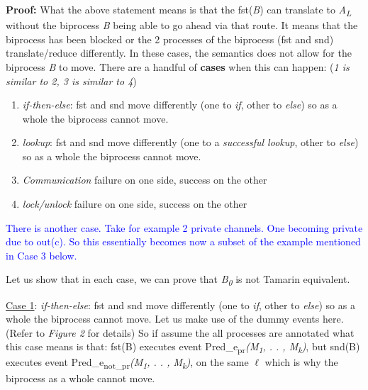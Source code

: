 \documentclass[11pt]{article}
\begin{document}
{\bf Proof: }What the above statement means is that the fst({\it B}) can translate to {\it A\textsubscript{L}} without the biprocess {\it B} being able to go ahead via that route. It means that the biprocess has been blocked or the 2 processes of the biprocess (fst and snd) translate/reduce differently. In these cases, the semantics does not allow for the biprocess {\it B} to move. There are a handful of {\bf cases} when this can happen: ({\it 1 is similar to 2, 3 is similar to 4})
\begin{enumerate}
  \item {\it if-then-else}: fst and snd move differently (one to {\it if}, other to {\it else}) so as a whole the biprocess \hspace*{58pt}cannot move.
  \vspace{-4pt}
  \item {\it lookup}: fst and snd move differently (one to a {\it successful lookup}, other to {\it else}) so as a \hspace*{42pt}whole the biprocess cannot move.
  \vspace{-4pt}
  \item {\it Communication} failure on one side, success on the other
  \vspace{-4pt}
  \item {\it lock/unlock} failure on one side, success on the other\newline
\end{enumerate}  
\textcolor{blue}{There is another case. Take for example 2 private channels. One becoming private due to out(c). So this essentially becomes now a subset of the example mentioned in Case 3 below.}     \newline

Let us show that in each case, we can prove that {\it B\textsubscript{0}} is not Tamarin equivalent.\newline

\underline{Case 1}:  {\it if-then-else}: fst and snd move differently (one to {\it if}, other to {\it else}) so as a whole the biprocess cannot move. Let us make use of the dummy events here. (Refer to {\it Figure 2} for details) So if assume the all processes are annotated what this case means is that: fst(B) executes event Pred\_e\textsubscript{pr}{\it (M\textsubscript{1}, . . , M\textsubscript{k})}, but snd(B) executes event Pred\_e\textsubscript{not\_pr}{\it (M\textsubscript{1}, . . , M\textsubscript{k})}, on the same $\ell$ which is why the biprocess as a whole cannot move.
\end{document}
